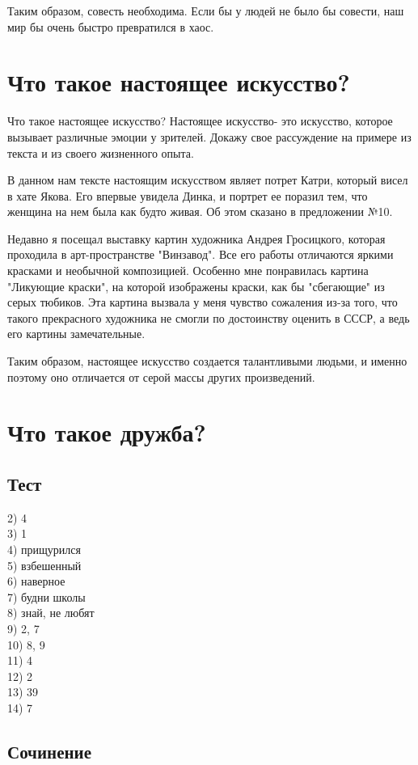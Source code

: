 \documentclass[12pt, letterpaper]{article}
\begin{document}
Таким образом, совесть необходима. Если бы у людей не было бы совести, наш мир бы очень быстро превратился в хаос. 
\section {Что такое настоящее искусство?}

Что такое настоящее искусство? Настоящее искусство- это искусство, которое вызывает различные эмоции у зрителей. Докажу свое рассуждение на примере из текста и из своего жизненного опыта.

В данном нам тексте настоящим искусством являет потрет Катри, который висел в хате Якова. Его впервые увидела Динка, и портрет ее поразил тем, что женщина на нем была как будто живая. Об этом сказано в предложении №10.

Недавно я посещал выставку картин художника Андрея Гросицкого, которая проходила в арт-пространстве "Винзавод". Все его работы отличаются яркими красками и необычной композицией. Особенно мне понравилась картина "Ликующие краски", на которой изображены краски, как бы "сбегающие" из серых тюбиков. Эта картина вызвала у меня чувство сожаления из-за того, что такого прекрасного художника не смогли по достоинству оценить в СССР, а ведь его картины замечательные.

Таким образом, настоящее искусство создается талантливыми людьми, и именно поэтому оно отличается от серой массы других произведений. 
\section{Что такое дружба?}
\subsection {Тест}
2) 4 \\
3) 1 \\
4) прищурился \\
5) взбешенный \\
6) наверное \\
7) будни школы \\
8) знай, не любят \\
9) 2, 7 \\
10) 8, 9 \\
11) 4 \\
12) 2 \\ 
13) 39 \\
14) 7 \\

\subsection {Сочинение}
\end{document}
